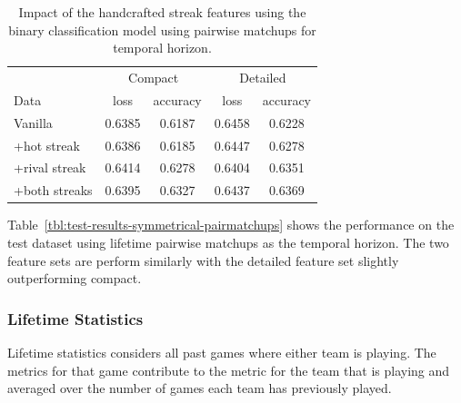 \documentclass{article} %
\begin{document}
\begin{table}
\centering
  \begin{tabular}{|l|c|c|c|c|}
  \hline
   & \multicolumn{2}{|c|}{Compact} & \multicolumn{2}{|c|}{Detailed}\\
  Data & loss & accuracy & loss & accuracy\\
  \hline
  Vanilla       & 0.6385 & 0.6187 & 0.6458 & 0.6228\\ 
  +hot streak   & 0.6386 & 0.6185 & 0.6447 & 0.6278\\
  +rival streak & 0.6414 & 0.6278 & 0.6404 & 0.6351\\
  +both streaks & 0.6395 & 0.6327 & 0.6437 & 0.6369\\
  \hline
  \end{tabular}
  \caption{Impact of the handcrafted streak features using the binary classification model using pairwise matchups for temporal horizon.}
\end{table}
\label{tbl:test-results-symmetrical-pairmatchups}

Table~\ref{tbl:test-results-symmetrical-pairmatchups} shows the performance on the test dataset using lifetime pairwise matchups as the temporal horizon.
The two feature sets are perform similarly with the detailed feature set slightly outperforming compact.



\subsubsection{Lifetime Statistics}

Lifetime statistics considers all past games where either team is playing.
The metrics for that game contribute to the metric for the team that is playing and averaged over the number of games each team has previously played.
\end{document}
